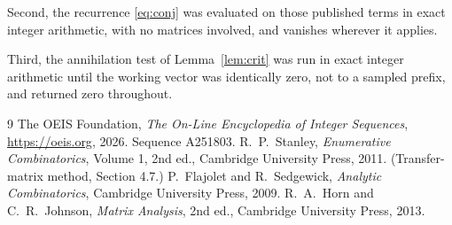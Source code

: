 \documentclass[11pt,a4paper]{article}
\theoremstyle{plain}
\theoremstyle{definition}
\begin{document}
Second, the recurrence \eqref{eq:conj} was evaluated on those published terms in exact
integer arithmetic, with no matrices involved, and vanishes wherever it applies.

Third, the annihilation test of Lemma~\ref{lem:crit} was run in exact integer arithmetic
until the working vector was identically zero, not to a sampled prefix, and returned zero
throughout.

\begin{thebibliography}{9}
 The OEIS Foundation, \emph{The On-Line Encyclopedia of Integer
Sequences}, \url{https://oeis.org}, 2026. Sequence A251803.
 R.~P.~Stanley, \emph{Enumerative Combinatorics}, Volume 1, 2nd ed.,
Cambridge University Press, 2011. (Transfer-matrix method, Section 4.7.)
 P.~Flajolet and R.~Sedgewick, \emph{Analytic Combinatorics}, Cambridge
University Press, 2009.
 R.~A.~Horn and C.~R.~Johnson, \emph{Matrix Analysis}, 2nd ed., Cambridge
University Press, 2013.
\end{thebibliography}
\end{document}
